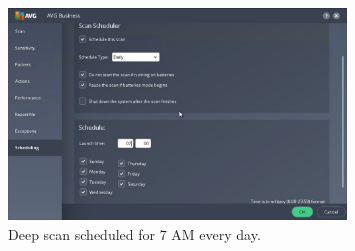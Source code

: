 \documentclass[a4paper]{article}
\begin{document}
	\begin{figure}[ht!]
		\centering
		\includegraphics[width=0.8\textwidth]{2_3_7}
		\caption{Deep scan scheduled for 7 AM every day.}
		\label{fig:2_3_7}
	\end{figure}
\end{document}
